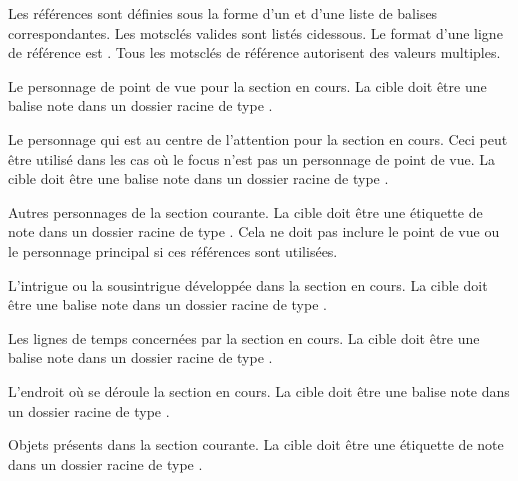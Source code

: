 \documentclass[a4paper,11pt,french]{sphinxmanual}
\begin{document}
\sphinxAtStartPar
Les références sont définies sous la forme d’un {\hyperref[\detokenize{int_glossary:term-Keyword}]{}} et d’une liste de balises correspondantes. Les mots\sphinxhyphen{}clés valides sont listés ci\sphinxhyphen{}dessous. Le format d’une ligne de référence est . Tous les mots\sphinxhyphen{}clés de référence autorisent des valeurs multiples.
\begin{description}
\sphinxAtStartPar
Le personnage de point de vue pour la section en cours. La cible doit être une balise note dans un dossier racine de type .

\sphinxAtStartPar
Le personnage qui est au centre de l’attention pour la section en cours. Ceci peut être utilisé dans les cas où le focus n’est pas un personnage de point de vue. La cible doit être une balise note dans un dossier racine de type .

\sphinxAtStartPar
Autres personnages de la section courante. La cible doit être une étiquette de note dans un dossier racine de type . Cela ne doit pas inclure le point de vue ou le personnage principal si ces références sont utilisées.

\sphinxAtStartPar
L’intrigue ou la sous\sphinxhyphen{}intrigue développée dans la section en cours. La cible doit être une balise note dans un dossier racine de type .

\sphinxAtStartPar
Les lignes de temps concernées par la section en cours. La cible doit être une balise note dans un dossier racine de type .

\sphinxAtStartPar
L’endroit où se déroule la section en cours. La cible doit être une balise note dans un dossier racine de type .

\sphinxAtStartPar
Objets présents dans la section courante. La cible doit être une étiquette de note dans un dossier racine de type .


\end{description}
\end{document}
